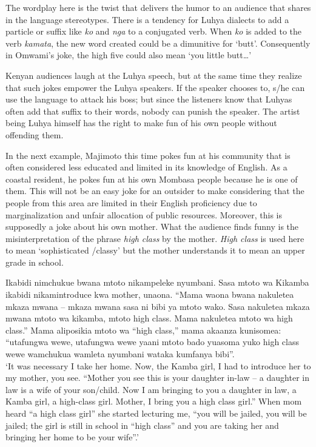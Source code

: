 \documentclass[output=paper]{langsci/langscibook}
\begin{document}
The wordplay here is the twist that delivers the humor to an audience that shares in the language stereotypes. There is a tendency for Luhya dialects to add a particle or suffix like \textit{ko} and \textit{nga} to a conjugated verb. When \textit{ko} is added to the verb \textit{kamata}, the new word created could be a dimunitive for ‘butt’. Consequently in Omwami’s joke, the high five could also mean ‘you little butt…’

Kenyan audiences laugh at the Luhya speech, but at the same time they realize that such jokes empower the Luhya speakers. If the speaker chooses to, s/he can use the language to attack his boss; but since the listeners know that Luhyas often add that suffix to their words, nobody can punish the speaker. The artist being Luhya himself has the right to make fun of his own people without offending them. 

In the next example, Majimoto this time pokes fun at his community that is often considered less educated and limited in its knowledge of English. As a coastal resident, he pokes fun at his own Mombasa people because he is one of them. This will not be an easy joke for an outsider to make considering that the people from this area are limited in their English proficiency due to marginalization and unfair allocation of public resources. Moreover, this is supposedly a joke about his own mother. What the audience finds funny is the misinterpretation of the phrase \textit{high class} by the mother. \textit{High class} is used here to mean ‘sophisticated /classy’ but the mother understands it to mean an upper grade in school. 

\ea
 Ikabidi nimchukue bwana mtoto nikampeleke nyumbani. Sasa mtoto wa Kikamba ikabidi nikamintroduce kwa mother, unaona. “Mama waona bwana nakuletea mkaza mwana – mkaza mwana sasa ni bibi ya mtoto wako. Sasa nakuletea mkaza mwana mtoto wa kikamba, mtoto high class. Mama nakuletea mtoto wa high class.” Mama aliposikia mtoto wa “high class,” mama akaanza kunisomea: “utafungwa wewe, utafungwa wewe yaani mtoto bado yuasoma yuko high class wewe wamchukua wamleta nyumbani wataka kumfanya bibi”.\\
\glt ‘It was necessary I take her home. Now, the Kamba girl, I had to introduce her to my mother, you see. “Mother you see this is your daughter in-law – a daughter in law is a wife of your son/child. Now I am bringing to you a daughter in law, a Kamba girl, a high-class girl. Mother, I bring you a high class girl.” When mom heard “a high class girl” she started lecturing me, “you will be jailed, you will be jailed; the girl is still in school in “high class” and you are taking her and bringing her home to be your wife”.’ \citep{ChurchillShow2015}
\z
\end{document}

